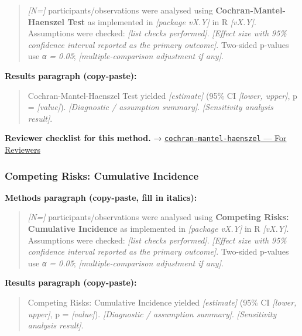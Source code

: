 \documentclass[
]{article}
\begin{document}
\begin{quote}
\emph{{[}N={]}} participants/observations were analysed using
\textbf{Cochran-Mantel-Haenszel Test} as implemented in \emph{{[}package
vX.Y{]}} in R \emph{{[}vX.Y{]}}. Assumptions were checked: \emph{{[}list
checks performed{]}}. \emph{{[}Effect size with 95\% confidence interval
reported as the primary outcome{]}}. Two-sided p-values use \emph{α =
0.05}; \emph{{[}multiple-comparison adjustment if any{]}}.
\end{quote}

\textbf{Results paragraph (copy-paste):}

\begin{quote}
Cochran-Mantel-Haenszel Test yielded \emph{{[}estimate{]}} (95\% CI
\emph{{[}lower, upper{]}}, p = \emph{{[}value{]}}). \emph{{[}Diagnostic
/ assumption summary{]}}. \emph{{[}Sensitivity analysis result{]}}.
\end{quote}

\textbf{Reviewer checklist for this method.} →
\href{../chapters/04-inferential/cochran-mantel-haenszel.Rmd\#for-reviewers}{\texttt{cochran-mantel-haenszel}
--- For Reviewers}

\subsubsection{Competing Risks: Cumulative
Incidence}\label{competing-risks-cumulative-incidence}

\textbf{Methods paragraph (copy-paste, fill in italics):}

\begin{quote}
\emph{{[}N={]}} participants/observations were analysed using
\textbf{Competing Risks: Cumulative Incidence} as implemented in
\emph{{[}package vX.Y{]}} in R \emph{{[}vX.Y{]}}. Assumptions were
checked: \emph{{[}list checks performed{]}}. \emph{{[}Effect size with
95\% confidence interval reported as the primary outcome{]}}. Two-sided
p-values use \emph{α = 0.05}; \emph{{[}multiple-comparison adjustment if
any{]}}.
\end{quote}

\textbf{Results paragraph (copy-paste):}

\begin{quote}
Competing Risks: Cumulative Incidence yielded \emph{{[}estimate{]}}
(95\% CI \emph{{[}lower, upper{]}}, p = \emph{{[}value{]}}).
\emph{{[}Diagnostic / assumption summary{]}}. \emph{{[}Sensitivity
analysis result{]}}.
\end{quote}
\end{document}
